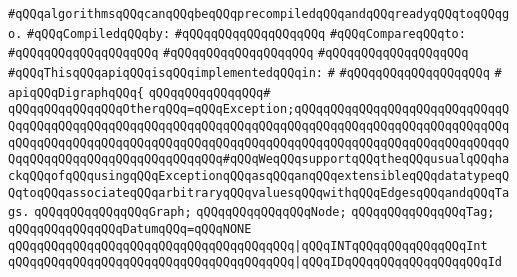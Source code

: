 \verb|#qQQqalgorithmsqQQqcanqQQqbeqQQqprecompiledqQQqandqQQqreadyqQQqtoqQQqgo.|\newline
\newline
\verb|#qQQqCompiledqQQqby:|\newline
\verb|#qQQqqQQqqQQqqQQqqQQq|\newline
\newline
\verb|#qQQqCompareqQQqto:|\newline
\verb|#qQQqqQQqqQQqqQQqqQQq|\newline
\verb|#qQQqqQQqqQQqqQQqqQQq|\newline
\verb|#qQQqqQQqqQQqqQQqqQQq|\newline
\newline
\verb|#qQQqThisqQQqapiqQQqisqQQqimplementedqQQqin:|\newline
\verb|#|\newline
\verb|#qQQqqQQqqQQqqQQqqQQq|\newline
\verb|#|\newline
\verb|apiqQQqDigraphqQQq{|\newline
\verb|qQQqqQQqqQQqqQQq#|\newline
\verb|qQQqqQQqqQQqqQQqOtherqQQq=qQQqException;qQQqqQQqqQQqqQQqqQQqqQQqqQQqqQQqqQQqqQQqqQQqqQQqqQQqqQQqqQQqqQQqqQQqqQQqqQQqqQQqqQQqqQQqqQQqqQQqqQQqqQQqqQQqqQQqqQQqqQQqqQQqqQQqqQQqqQQqqQQqqQQqqQQqqQQqqQQqqQQqqQQqqQQqqQQqqQQqqQQqqQQqqQQqqQQqqQQqqQQq#qQQqWeqQQqsupportqQQqtheqQQqusualqQQqhackqQQqofqQQqusingqQQqExceptionqQQqasqQQqanqQQqextensibleqQQqdatatypeqQQqtoqQQqassociateqQQqarbitraryqQQqvaluesqQQqwithqQQqEdgesqQQqandqQQqTags.|\newline
\newline
\verb|qQQqqQQqqQQqqQQqGraph;|\newline
\verb|qQQqqQQqqQQqqQQqNode;|\newline
\verb|qQQqqQQqqQQqqQQqTag;|\newline
\newline
\verb|qQQqqQQqqQQqqQQqDatumqQQq=qQQqNONE|\newline
\verb|qQQqqQQqqQQqqQQqqQQqqQQqqQQqqQQqqQQqqQQq|\verb#|qQQqINTqQQqqQQqqQQqqQQqInt#\newline
\verb|qQQqqQQqqQQqqQQqqQQqqQQqqQQqqQQqqQQqqQQq|\verb#|qQQqIDqQQqqQQqqQQqqQQqqQQqId#\newline
